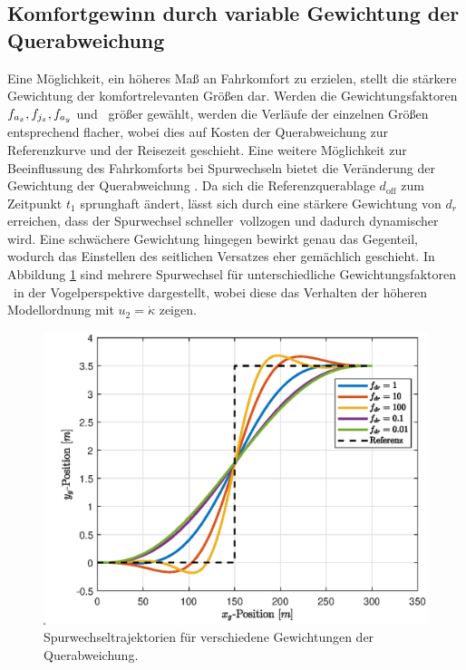 \subsection{Komfortgewinn durch variable Gewichtung der Querabweichung}
Eine Möglichkeit, ein höheres Maß an Fahrkomfort zu erzielen, stellt die stärkere Gewichtung der komfortrelevanten Größen dar. Werden die Gewichtungsfaktoren $f_{a_x}, f_{j_x}, f_{a_y}$ und \fjy~größer gewählt, werden die Verläufe der einzelnen Größen entsprechend flacher, wobei dies auf Kosten der Querabweichung zur Referenzkurve und der Reisezeit geschieht. Eine weitere Möglichkeit zur Beeinflussung des Fahrkomforts bei Spurwechseln bietet die Veränderung der Gewichtung der Querabweichung \fdr. Da sich die Referenzquerablage $d_{\textrm{off}}$ zum Zeitpunkt $t_1$ sprunghaft ändert, lässt sich durch eine stärkere Gewichtung von $d_r$ erreichen, dass der Spurwechsel \glqq schneller\grqq~vollzogen und dadurch dynamischer wird. Eine schwächere Gewichtung hingegen bewirkt genau das Gegenteil, wodurch das Einstellen des seitlichen Versatzes eher gemächlich geschieht. In Abbildung \ref{fig:xy_pos_fdr_var} sind mehrere Spurwechsel für unterschiedliche Gewichtungsfaktoren \fdr~in der Vogelperspektive dargestellt, wobei diese das Verhalten der höheren Modellordnung mit $u_2 = \dot{\kappa}$ zeigen. 
\begin{figure}[h] 
	\centering
	\includegraphics[width=0.75\linewidth]{./Bilder/Ergebnisse/Geradeausfahrt/Spurwechsel/fdr_var/xy_pos.eps}
	\caption{Spurwechseltrajektorien für verschiedene Gewichtungen der Querabweichung.}
	\label{fig:xy_pos_fdr_var}
\end{figure}  
